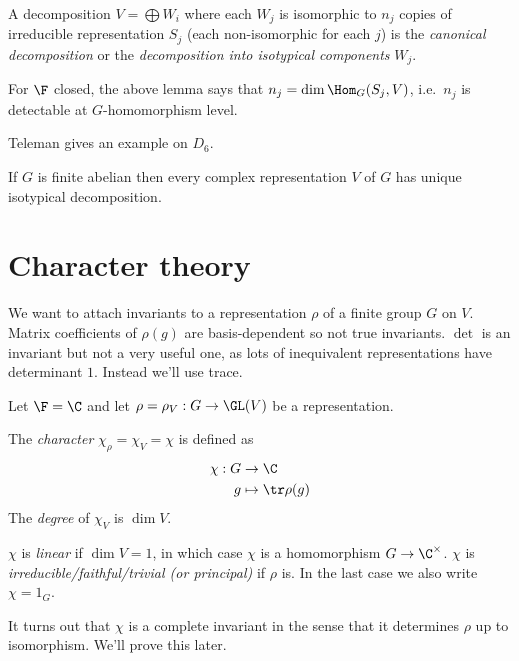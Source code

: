\documentclass[a4paper]{article}
\theoremstyle{definition}
\begin{document}
\begin{definition}
  A decomposition \(V = \bigoplus W_i\) where each \(W_j\) is isomorphic to \(n_j\) copies of irreducible representation \(S_j\) (each non-isomorphic for each \(j\)) is the \emph{canonical decomposition} or the \emph{decomposition into isotypical components} \(W_j\).
\end{definition}

For \(\F\) closed, the above lemma says that \(n_j = \dim \Hom_G(S_j, V)\), i.e.\ \(n_j\) is detectable at \(G\)-homomorphism level.

\begin{eg}
  Teleman  gives an example on \(D_6\).

  If \(G\) is finite abelian then every complex representation \(V\) of \(G\) has unique isotypical decomposition.
\end{eg}

\section{Character theory}

We want to attach invariants to a representation \(\rho\) of a finite group \(G\) on \(V\). Matrix coefficients of \(\rho(g)\) are basis-dependent so not true invariants. \(\det\) is an invariant but not a very useful one, as lots of inequivalent representations have determinant \(1\). Instead we'll use trace.

Let \(\F = \C\) and let \(\rho = \rho_V: G \to \GL(V)\) be a representation.

\begin{definition}[character]
  The \emph{character} \(\chi_\rho = \chi_V = \chi\) is defined as
  \begin{align*}
    \chi: G &\to \C \\
    g &\mapsto \tr \rho(g)
  \end{align*}
  The \emph{degree} of \(\chi_V\) is \(\dim V\).

  \(\chi\) is \emph{linear} if \(\dim V = 1\), in which case \(\chi\) is a homomorphism \(G \to \C^\times\). \(\chi\) is \emph{irreducible/faithful/trivial (or principal)} if \(\rho\) is. In the last case we also write \(\chi = 1_G\).
\end{definition}

It turns out that \(\chi\) is a complete invariant in the sense that it determines \(\rho\) up to isomorphism. We'll prove this later.
\end{document}
